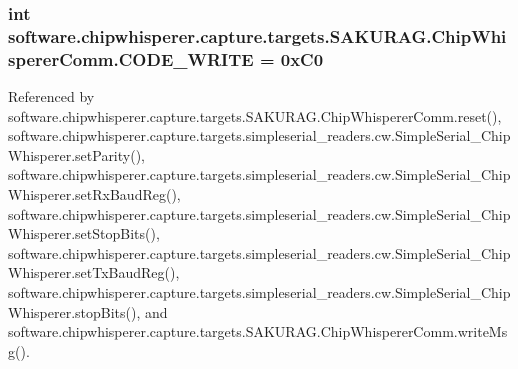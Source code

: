 \hypertarget{classsoftware_1_1chipwhisperer_1_1capture_1_1targets_1_1SAKURAG_1_1ChipWhispererComm_a1e107c656728a8cc0f3ceaa461c9e852}{}
\subsubsection[{C\+O\+D\+E\+\_\+\+W\+R\+I\+T\+E}]{\setlength{\rightskip}{0pt plus 5cm}int software.\+chipwhisperer.\+capture.\+targets.\+S\+A\+K\+U\+R\+A\+G.\+Chip\+Whisperer\+Comm.\+C\+O\+D\+E\+\_\+\+W\+R\+I\+T\+E = 0x\+C0\hspace{0.3cm}{\ttfamily [static]}}\label{classsoftware_1_1chipwhisperer_1_1capture_1_1targets_1_1SAKURAG_1_1ChipWhispererComm_a1e107c656728a8cc0f3ceaa461c9e852}


Referenced by software.\+chipwhisperer.\+capture.\+targets.\+S\+A\+K\+U\+R\+A\+G.\+Chip\+Whisperer\+Comm.\+reset(), software.\+chipwhisperer.\+capture.\+targets.\+simpleserial\+\_\+readers.\+cw.\+Simple\+Serial\+\_\+\+Chip\+Whisperer.\+set\+Parity(), software.\+chipwhisperer.\+capture.\+targets.\+simpleserial\+\_\+readers.\+cw.\+Simple\+Serial\+\_\+\+Chip\+Whisperer.\+set\+Rx\+Baud\+Reg(), software.\+chipwhisperer.\+capture.\+targets.\+simpleserial\+\_\+readers.\+cw.\+Simple\+Serial\+\_\+\+Chip\+Whisperer.\+set\+Stop\+Bits(), software.\+chipwhisperer.\+capture.\+targets.\+simpleserial\+\_\+readers.\+cw.\+Simple\+Serial\+\_\+\+Chip\+Whisperer.\+set\+Tx\+Baud\+Reg(), software.\+chipwhisperer.\+capture.\+targets.\+simpleserial\+\_\+readers.\+cw.\+Simple\+Serial\+\_\+\+Chip\+Whisperer.\+stop\+Bits(), and software.\+chipwhisperer.\+capture.\+targets.\+S\+A\+K\+U\+R\+A\+G.\+Chip\+Whisperer\+Comm.\+write\+Msg().

\hypertarget{classsoftware_1_1chipwhisperer_1_1capture_1_1targets_1_1SAKURAG_1_1ChipWhispererComm_af3f1fa7ab94831dff83830566879e9b1}{}
